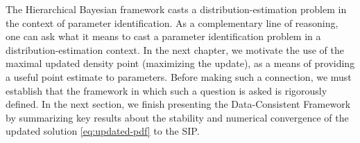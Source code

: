 The Hierarchical Bayesian framework casts a distribution-estimation problem in the context of parameter identification.
As a complementary line of reasoning, one can ask what it means to cast a parameter identification problem in a distribution-estimation context.
In the next chapter, we motivate the use of the maximal updated density point (maximizing the update), as a means of providing a useful point estimate to parameters.
Before making such a connection, we must establish that the framework in which such a question is asked is rigorously defined.
In the next section, we finish presenting the Data-Consistent Framework by summarizing key results about the stability and numerical convergence of the updated solution \eqref{eq:updated-pdf} to the SIP.

\FloatBarrier

